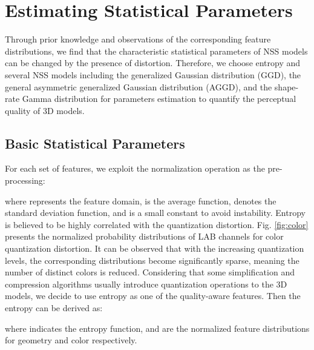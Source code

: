 \documentclass[lettersize,journal]{IEEEtran}
\begin{document}
\section{Estimating Statistical Parameters}
\label{sec:estimate nss parameters}
Through prior knowledge and observations of the corresponding feature distributions, we find that the characteristic statistical parameters of NSS models can be changed by the presence of distortion. Therefore, we choose entropy and several NSS models including the generalized Gaussian distribution (GGD), the general asymmetric generalized Gaussian distribution (AGGD), and the shape-rate Gamma distribution for parameters estimation to quantify the perceptual quality of 3D models. 



\subsection{Basic Statistical Parameters}
For each set of features, we exploit the normalization operation as the pre-processing:

where  represents the feature domain,  is the average function,  denotes the standard deviation function, and  is a small constant to avoid instability.
Entropy is believed to be highly correlated with the quantization distortion. Fig. \ref{fig:color} presents the normalized probability distributions of LAB channels for color quantization distortion. It can be observed that with the increasing quantization levels, the corresponding distributions become significantly sparse, meaning the number of distinct colors is reduced.  
Considering that some simplification and compression algorithms usually introduce quantization operations to the 3D models, we decide to use entropy as one of the quality-aware features.
Then the entropy can be derived as:

where  indicates the entropy function,  and  are the normalized feature distributions for geometry and color respectively.  
\end{document}
